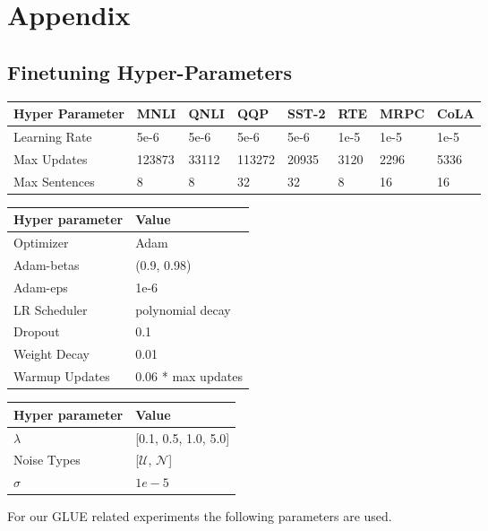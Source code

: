 \documentclass[11pt,a4paper]{article}
\begin{document}



\clearpage
\appendix
\section{Appendix}
\subsection{Finetuning Hyper-Parameters}
\begin{table*}[!htpb]
\centering
\begin{tabular}{@{}llllllll@{}}
\toprule
Hyper Parameter & MNLI   & QNLI  & QQP    & SST-2 & RTE  & MRPC & CoLA \\ \midrule
Learning Rate   & 5e-6   & 5e-6  & 5e-6   & 5e-6  & 1e-5 & 1e-5 & 1e-5 \\
Max Updates     & 123873 & 33112 & 113272 & 20935 & 3120 & 2296 & 5336 \\
Max Sentences   & 8      & 8     & 32     & 32    & 8    & 16   & 16   \\
\bottomrule  
\end{tabular}
\caption{Task specific hyper parameters for GLUE experiments}
\end{table*}

\begin{table*}[!htpb]
\centering
\begin{tabular}{@{}ll@{}}
\toprule
Hyper parameter & Value              \\ \midrule
Optimizer       & Adam               \\
Adam-betas      & (0.9, 0.98)        \\
Adam-eps        & 1e-6               \\
LR Scheduler    & polynomial decay   \\
Dropout         & 0.1                \\
Weight Decay    & 0.01               \\
Warmup Updates  & 0.06 * max updates \\
\bottomrule
\end{tabular}
\quad
\begin{tabular}{@{}ll@{}}
\toprule
Hyper parameter & Value           \\ \midrule
$\lambda$          & [0.1, 0.5, 1.0, 5.0] \\
Noise Types     & [$\mathcal{U}$, $\mathcal{N}$] \\
$\sigma$        & $1e-5$\\ 
\bottomrule
\end{tabular}
\caption{Hyper parameters for R3F experiments on GLUE}
\end{table*}
For our GLUE related experiments the following parameters are used.
\end{document}
